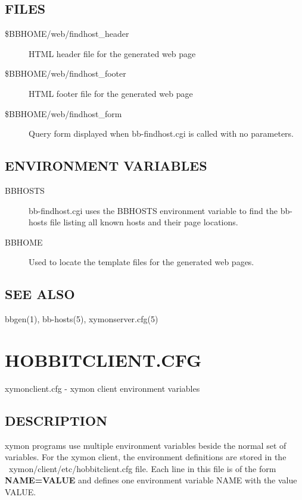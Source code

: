 \subsection{FILES}
\begin{description}
\item[\$BBHOME/web/findhost\_header] HTML header file for the generated web page 

 

\item[\$BBHOME/web/findhost\_footer] HTML footer file for the generated web page 

 

\item[\$BBHOME/web/findhost\_form] Query form displayed when
  bb-findhost.cgi is called with no parameters. 


\end{description}
\subsection{ENVIRONMENT VARIABLES}
\begin{description}
\item[BBHOSTS] bb-findhost.cgi uses the BBHOSTS environment variable
  to find the bb-hosts file listing all known hosts and their page
  locations. 


\item[BBHOME] Used to locate the template files for the generated web pages. 


\end{description}
\subsection{SEE ALSO}
bbgen(1), bb-hosts(5), xymonserver.cfg(5) 

 
%
\newpage
\section{HOBBITCLIENT.CFG}

 xymonclient.cfg - xymon client environment variables 

 

\subsection{DESCRIPTION}
 xymon programs use multiple environment variables beside the normal
 set of variables. For the xymon client, the environment definitions
 are stored in the ~xymon/client/etc/hobbitclient.cfg file. Each line
 in this file is of the form \textbf{NAME=VALUE} and defines one
 environment variable NAME with the value VALUE. 


